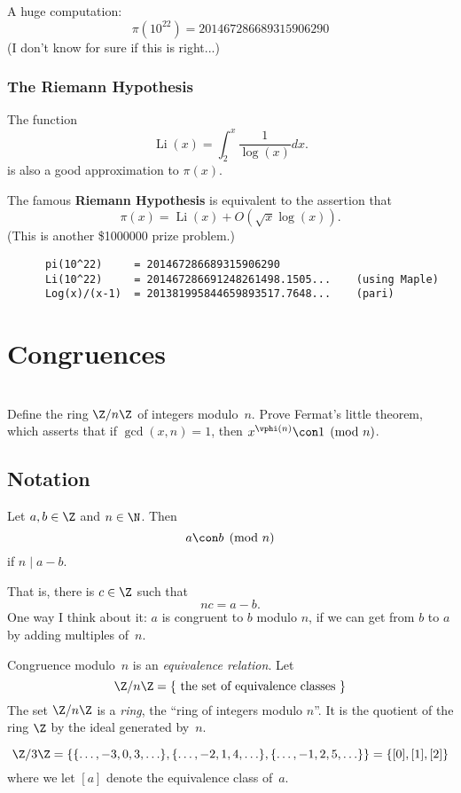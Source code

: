 \documentclass[11pt]{report}
\DeclareMathOperator{\Li}{Li}
\begin{document}
A huge computation:
$$
  \pi(10^{22}) = 201467286689315906290
$$
(I don't know for sure if this is right...)

\subsection{The Riemann Hypothesis}
The function
$$
  \Li(x) = \int_{2}^{x} \frac{1}{\log(x)} dx.
$$
is also a good approximation to $\pi(x)$.

The famous {\bf Riemann Hypothesis} is equivalent to the
assertion that
$$
  \pi(x) = \Li(x) +O(\sqrt{x}\log(x)).
$$
(This is another \$1000000 prize problem.)

\begin{verbatim}
      pi(10^22)     = 201467286689315906290
      Li(10^22)     = 201467286691248261498.1505...    (using Maple)
      Log(x)/(x-1)  = 201381995844659893517.7648...    (pari)
\end{verbatim}




\chapter{Congruences}



\\
Define the ring $\Z/n\Z$ of integers modulo~$n$.
Prove Fermat's little theorem, which asserts
that if $\gcd(x,n)=1$, then $x^{\vphi(n)} \con 1\pmod{n}$.

\section{Notation}
\begin{definition}[Congruence]
  Let $a,b\in\Z$ and $n\in\N$.  Then
  $$
    a\con b\pmod{n}
  $$
  if $n\mid a-b$.
\end{definition}
That is, there is $c\in\Z$ such that
$$
  nc = a-b.
$$
One way I think about it: $a$ is congruent to $b$ modulo $n$, if
we can get from $b$ to $a$ by adding multiples of~$n$.

Congruence modulo~$n$ is an {\em equivalence relation}.
Let
$$
  \Z/n\Z = \{\text{ the set of equivalence classes }\}
$$
The set $\Z/n\Z$ is a {\em ring}, the ``ring of integers
modulo $n$''.  It is the quotient of the ring $\Z$ by
the ideal generated by~$n$.

\begin{example}
  $$
    \Z/3\Z = \{ \{\ldots, -3, 0, 3, \ldots\},
    \{\ldots, -2, 1, 4, \ldots\},
    \{\ldots, -1, 2, 5, \ldots\}\}
    = \{[0], [1], [2]\}
  $$
  where we let $[a]$ denote the equivalence class of~$a$.
\end{example}
\end{document}
